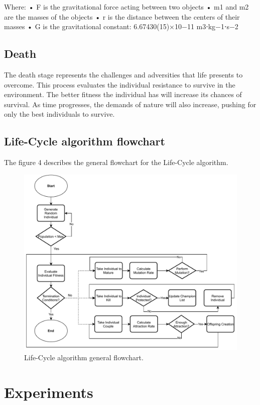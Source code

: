 \documentclass[runningheads]{llncs}
\begin{document}
Where:
•	F is the gravitational force acting between two objects
•	m1 and m2 are the masses of the objects
•	r is the distance between the centers of their masses
•	G is the gravitational constant: 6.67430(15)×10−11 m3⋅kg−1⋅s−2


\subsection{Death}

The death stage represents the challenges and adversities that life presents to
overcome. This process evaluates the individual resistance to survive in the
environment. The better fitness the individual has will increase its chances of
survival. As time progresses, the demands of nature will also increase, pushing
for only the best individuals to survive.

\subsection{Life-Cycle algorithm flowchart}

The figure 4 describes the general flowchart for the Life-Cycle algorithm.

\begin{figure}
    \includegraphics[width=\textwidth]{img/fig4_flowchart.pdf}
    \caption{Life-Cycle algorithm general flowchart.} \label{fig4}
    \end{figure}


\section{Experiments} 
\end{document}
